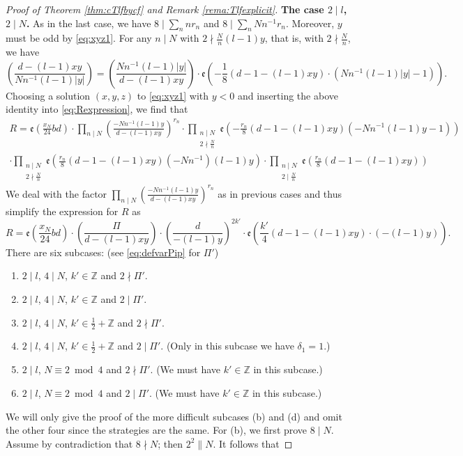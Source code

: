 \documentclass[12pt]{amsart}
\numberwithin{equation}{section}
\theoremstyle{plain}
\theoremstyle{definition}
\theoremstyle{remark}
\newcommand\twoscript[2]{\substack{{#1} \\ {#2}}}
\newcommand\legendre[2]{\genfrac{(}{)}{}{}{#1}{#2}}
\newcommand*\abs[1]{\lvert#1\rvert}
\newcommand\etp[1]{\mathfrak{e}\left(#1\right)}
\newcommand\numZ{\mathbb{Z}}
\begin{document}
\begin{proof}[Proof of Theorem \ref{thm:cTlfbycf} and Remark \ref{rema:Tlfexplicit}]
\textbf{The case $2\mid l$, $2\mid N$.} As in the last case, we have $8\mid\sum_nnr_n$ and $8\mid\sum_nNn^{-1}r_n$. Moreover, $y$ must be odd by \eqref{eq:xyz1}. For any $n\mid N$ with $2\nmid\frac{N}{n}(l-1)y$, that is, with $2\nmid\frac{N}{n}$, we have
\begin{equation*}
\legendre{d-(l-1)xy}{Nn^{-1}(l-1)\abs{y}}=\legendre{Nn^{-1}(l-1)\abs{y}}{d-(l-1)xy}\cdot\etp{-\frac{1}{8}(d-1-(l-1)xy)\cdot(Nn^{-1}(l-1)\abs{y}-1)}.
\end{equation*}
Choosing a solution $(x,y,z)$ to \eqref{eq:xyz1} with $y<0$ and inserting the above identity into \eqref{eq:Rexpression}, we find that
\begin{multline*}
R=\etp{\frac{x_N}{24}bd}\cdot\prod_{n\mid N}\legendre{-Nn^{-1}(l-1)y}{d-(l-1)xy}^{r_n}\cdot\prod_{\twoscript{n\mid N}{2\nmid\frac{N}{n}}}\etp{-\frac{r_n}{8}(d-1-(l-1)xy)(-Nn^{-1}(l-1)y-1)}\\
\cdot\prod_{\twoscript{n\mid N}{2\nmid\frac{N}{n}}}\etp{\frac{r_n}{8}(d-1-(l-1)xy)(-Nn^{-1})(l-1)y}\cdot\prod_{\twoscript{n\mid N}{2\mid\frac{N}{n}}}\etp{\frac{r_n}{8}(d-1-(l-1)xy)}
\end{multline*}
We deal with the factor $\prod_{n\mid N}\legendre{-Nn^{-1}(l-1)y}{d-(l-1)xy}^{r_n}$ as in previous cases and thus simplify the expression for $R$ as
\begin{equation}
\label{eq:R2midl2midN}
R=\etp{\frac{x_N}{24}bd}\cdot\legendre{\varPi}{d-(l-1)xy}\cdot\legendre{d}{-(l-1)y}^{2k'}\cdot\etp{\frac{k'}{4}(d-1-(l-1)xy)\cdot(-(l-1)y)}. 
\end{equation}
There are six subcases: (see \eqref{eq:defvarPip} for $\varPi'$)
\begin{enumerate}
  \item $2\mid l$, $4\mid N$, $k'\in\numZ$ and $2\nmid\varPi'$.
  \item $2\mid l$, $4\mid N$, $k'\in\numZ$ and $2\mid\varPi'$.
  \item $2\mid l$, $4\mid N$, $k'\in\frac{1}{2}+\numZ$ and $2\nmid\varPi'$.
  \item $2\mid l$, $4\mid N$, $k'\in\frac{1}{2}+\numZ$ and $2\mid\varPi'$. (Only in this subcase we have $\delta_1=1$.)
  \item $2\mid l$, $N\equiv2\bmod{4}$ and $2\nmid\varPi'$. (We must have $k'\in\numZ$ in this subcase.)
  \item $2\mid l$, $N\equiv2\bmod{4}$ and $2\mid\varPi'$. (We must have $k'\in\numZ$ in this subcase.)
\end{enumerate}
We will only give the proof of the more difficult subcases (b) and (d) and omit the other four since the strategies are the same. For (b), we first prove $8\mid N$. Assume by contradiction that $8\nmid N$; then $2^2\parallel N$. It follows that

\end{proof}
\end{document}
